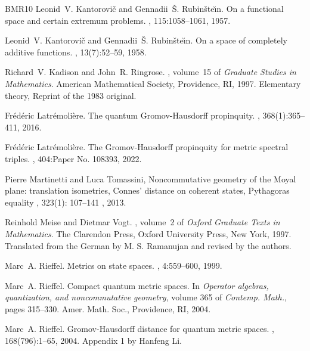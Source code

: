 \documentclass[12pt,a4paper,twoside,reqno]{amsart}
\theoremstyle{plain}
\theoremstyle{definition}
\theoremstyle{remark} %
\theoremstyle{plain}
\numberwithin{equation}{section}
\begin{document}
\begin{thebibliography}{BMR10}
Leonid~V. Kantorovi\v{c} and Gennadii~\v{S}. Rubin\v{s}te\u{\i}n.
\newblock On a functional space and certain extremum problems.
, 115:1058--1061, 1957.

Leonid~V. Kantorovi\v{c} and Gennadii~\v{S}. Rubin\v{s}te\u{\i}n.
\newblock On a space of completely additive functions.
, 13(7):52--59, 1958.

Richard~V. Kadison and John~R. Ringrose.
,
  volume~15 of {\em Graduate Studies in Mathematics}.
\newblock American Mathematical Society, Providence, RI, 1997.
\newblock Elementary theory, Reprint of the 1983 original.

Fr\'{e}d\'{e}ric Latr\'{e}moli\`ere.
\newblock The quantum {G}romov-{H}ausdorff propinquity.
, 368(1):365--411, 2016.

Fr\'{e}d\'{e}ric Latr\'{e}moli\`ere.
\newblock The {G}romov-{H}ausdorff propinquity for metric spectral triples.
, 404:Paper No. 108393, 2022.


Pierre Martinetti and  Luca Tomassini,
\newblock Noncommutative geometry of the {M}oyal plane: translation
              isometries, {C}onnes' distance on coherent states,
              {P}ythagoras equality
, 323(1): 107--141 , 2013.



Reinhold Meise and Dietmar Vogt.
, volume~2 of {\em Oxford
  Graduate Texts in Mathematics}.
\newblock The Clarendon Press, Oxford University Press, New York, 1997.
\newblock Translated from the German by M. S. Ramanujan and revised by the
  authors.

Marc~A. Rieffel.
\newblock Metrics on state spaces.
, 4:559--600, 1999.

Marc~A. Rieffel.
\newblock Compact quantum metric spaces.
\newblock In {\em Operator algebras, quantization, and noncommutative
  geometry}, volume 365 of {\em Contemp. Math.}, pages 315--330. Amer. Math.
  Soc., Providence, RI, 2004.

Marc~A. Rieffel.
\newblock Gromov-{H}ausdorff distance for quantum metric spaces.
, 168(796):1--65, 2004.
\newblock Appendix 1 by Hanfeng Li.


\end{thebibliography}
\end{document}
